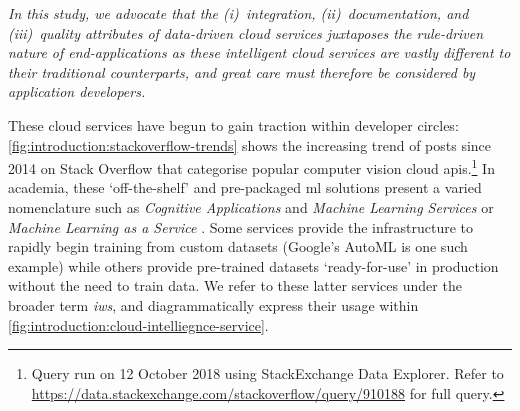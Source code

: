 

\begin{framed}
\itshape
\noindent
In this study, we advocate that the (i)~integration, (ii)~documentation, and (iii)~quality attributes of data-driven cloud services juxtaposes the rule-driven nature of end-applications as these intelligent cloud services are vastly different to their traditional counterparts, and great care must therefore be considered by application developers.
\end{framed}
\upshape
\bigskip

These cloud services have begun to gain traction within developer circles: \cref{fig:introduction:stackoverflow-trends} shows the increasing trend of posts since 2014 on Stack Overflow that categorise popular computer vision cloud \glspl{api}.\footnote{Query run on 12 October 2018 using StackExchange Data Explorer. Refer to \url{https://data.stackexchange.com/stackoverflow/query/910188} for full query.} In academia, these `off-the-shelf' and pre-packaged \gls{ml} solutions present a varied nomenclature such as \textit{Cognitive Applications} and \textit{Machine Learning Services} \citep{Hwang:2017tr} or \textit{Machine Learning as a Service} \citep{Ribeiro:2015dz}. Some services provide the infrastructure to rapidly begin training from custom datasets (Google's AutoML is one such example) while others provide pre-trained datasets `ready-for-use' in production without the need to train data. We refer to these latter services under the broader term \textit{\gls{iws}}, and diagrammatically express their usage within \cref{fig:introduction:cloud-intelliegnce-service}.


